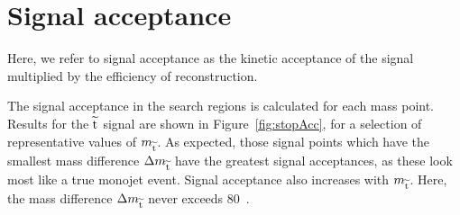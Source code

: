\section{Signal acceptance}
\label{sec:sigAccep}

Here, we refer to signal acceptance as the kinetic acceptance of the signal multiplied by the efficiency of reconstruction. 

The signal acceptance in the search regions is calculated for each mass point. 
Results for the $\widetilde{{\rm t}}$ signal are shown in Figure~\ref{fig:stopAcc}, for a selection of representative values of $m_{\widetilde{{\rm t}}}$.
As expected, those signal points which have the smallest mass difference $\Delta m_{\widetilde{{\rm t}}}$ have the greatest signal acceptances, as these look most like a true monojet event. 
Signal acceptance also increases with $m_{\widetilde{{\rm t}}}$.
Here, the mass difference $\Delta m_{\widetilde{{\rm t}}}$ never exceeds 80~\GeV.


